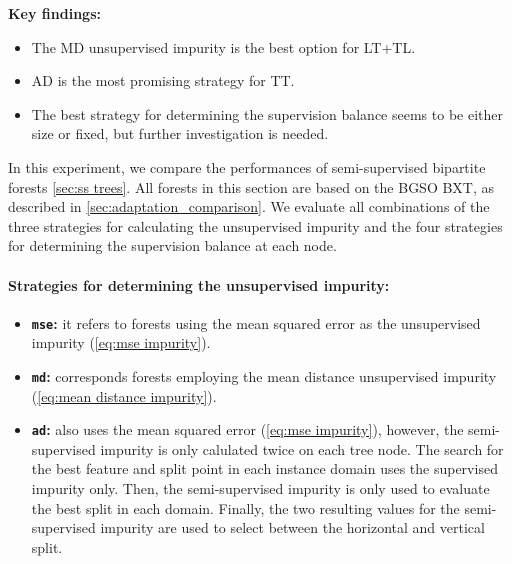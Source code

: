 \begin{mdframed}
    \textbf{Key findings:}
    \begin{itemize}
        \item The MD unsupervised impurity is the best option for LT+TL.
        \item AD is the most promising strategy for TT.
        \item The best strategy for determining the supervision balance seems to be either size or fixed, but further investigation is needed.
    \end{itemize}
\end{mdframed}

In this experiment, we compare the performances of semi-supervised bipartite forests \autoref{sec:ss trees}. All forests in this section are based on the BGSO BXT, as described in \autoref{sec:adaptation_comparison}. We evaluate all combinations of the three strategies for calculating the unsupervised impurity and the four strategies for determining the supervision balance at each node.

\paragraph*{Strategies for determining the unsupervised impurity:}
\begin{itemize}
    \item \textbf{\texttt{mse}:} it refers to forests using the mean squared error as the unsupervised impurity (\autoref{eq:mse impurity}).
    \item \textbf{\texttt{md}:} corresponds forests employing the mean distance unsupervised impurity (\autoref{eq:mean distance impurity}).
    \item \textbf{\texttt{ad}:} also uses the mean squared error (\autoref{eq:mse impurity}), however, the semi-supervised impurity is only calulated twice on each tree node. The search for the best feature and split point in each instance domain uses the supervised impurity only. Then, the semi-supervised impurity is only used to evaluate the best split in each domain. Finally, the two resulting values for the semi-supervised impurity are used to select between the horizontal and vertical split.
\end{itemize}


